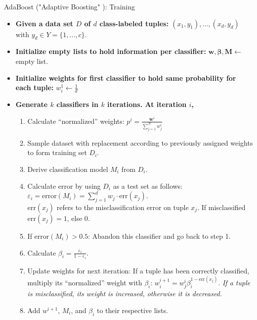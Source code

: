 \begin{frame}{AdaBoost ("Adaptive Boosting" ): Training}
	\vspace*{-1em}
	\begin{itemize}
		\item \textbf{Given a data set $D$ of $d$ class-labeled tuples: $(x_1 , y_1), \ldots, (x_d, y_d)$} with $y_d \in Y = \{1, \dots, c\}$.
		\item \textbf{Initialize empty lists to hold information per classifier:} $\textbf{w}, \boldsymbol{\beta}, \textbf{M} \leftarrow $ empty list.
		\item \textbf{Initialize weights for first classifier to hold same probability for each tuple:} $w_i^1 \leftarrow \frac{1}{d}$
		\item \textbf{Generate $k$ classifiers in $k$ iterations. At iteration $i$,}
		      \begin{enumerate}
			      \item Calculate ``normalized'' weights: $p^i = \frac{\textbf{w}^i}{\sum_{j=1}^N w_j^i}$
			      \item Sample dataset with replacement according to previously assigned weights to form training set $D_i$.
			      \item Derive classification model $M_i$ from $D_i$.
			      \item Calculate error by using $D_i$ as a test set as follows: $\varepsilon_i = \text{error}(M_i) = \sum_{j=1}^{d} w_j \cdot \text{err}(x_j)$.\\
			            $\text{err}(x_j)$ refers to the misclassification error on tuple $x_j$. If misclassified $\text{err}(x_j)=1$, else $0$.
			      \item If $\text{error}(M_i)>0.5$: Abandon this classifier and go back to step 1.
			      \item Calculate $\beta_i = \frac{\varepsilon_i}{1 - \varepsilon_i}$.
			      \item Update weights for next iteration: If a tuple has been correctly classified, multiply its ``normalized'' weight with $\beta_i$:  $w^{i+1}_i=w^i_j \beta^{1-\text{err}(x_j)}_i$. \textit{If a tuple is misclassified, its weight is increased, otherwise it is decreased.}
			      \item Add $w^{i+1}$, $M_i$, and $\beta_i$ to their respective lists.
		      \end{enumerate}
	\end{itemize}
\end{frame}

